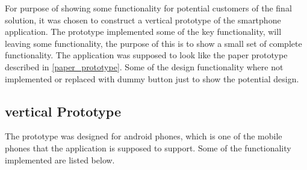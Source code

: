 For purpose of showing some functionality for potential customers of the final solution, it was chosen to construct a vertical prototype of the smartphone application. 
The prototype implemented some of the key functionality, will leaving some functionality, the purpose of this is to show a small set of complete functionality. The application was supposed to look like the paper prototype described in \cref{paper_prototype}. Some of the design functionality where not implemented or replaced with dummy button just to show the potential design.  

\subsection{vertical Prototype}
\label{sub:vertical_prototype}
The prototype was designed for android phones, which is one of the mobile phones that the application is supposed to support. Some of the functionality implemented are listed below. 
